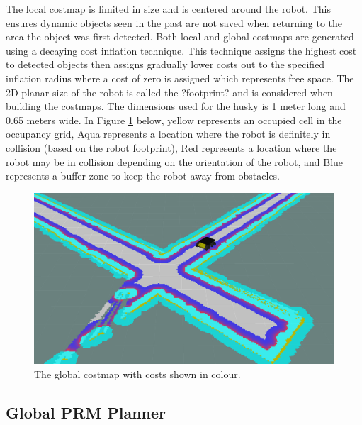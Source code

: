 \documentclass[letterpaper, 10 pt, conference]{ieeeconf}  %
\begin{document}
The local costmap is limited in size and is centered around the robot. This ensures dynamic objects seen in the past are not saved when returning to the area the object was first detected. Both local and global costmaps are generated using a decaying cost inflation technique. This technique assigns the highest cost to detected objects then assigns gradually lower costs out to the specified inflation radius where a cost of zero is assigned which represents free space. The 2D planar size of the robot is called the ?footprint? and is considered when building the costmaps. The dimensions used for the husky is 1 meter long and 0.65 meters wide. In Figure \ref{global_costmap} below, yellow represents an occupied cell in the occupancy grid, Aqua represents a location where the robot is definitely in collision (based on the robot footprint), Red represents a location where the robot may be in collision depending on the orientation of the robot, and Blue represents a buffer zone to keep the robot away from obstacles.

	\begin{figure}[!ht]
		\centering
		\includegraphics[width=1.0\columnwidth]{Figures/global_costmap}
		\caption{The global costmap with costs shown in colour.}
		\label{global_costmap}
	\end{figure}

\subsection{Global PRM Planner}
\end{document}
